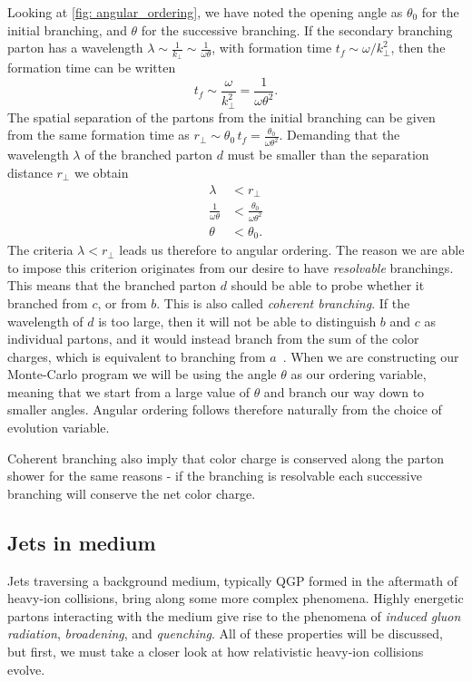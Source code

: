 \documentclass[main.tex]{subfiles}
\begin{document}
Looking at \autoref{fig: angular_ordering}, we have noted the opening angle as \(\theta_0\) for the initial branching, and \(\theta\) for the successive branching. If the secondary branching parton has a wavelength \(\lambda \sim \frac{1}{k_\perp} \sim \frac{1}{\omega \theta}\), with formation time \(t_f\sim \omega/k_\perp^2\), then the formation time can be written
\begin{equation}
    t_f \sim \frac{\omega}{k_\perp^2} = \frac{1}{\omega \theta^2}.
\end{equation}
The spatial separation of the partons from the initial branching can be given from the same formation time as \(r_\perp \sim \theta_0\, t_f = \frac{\theta_0}{\omega \theta^2}\). Demanding that the wavelength \(\lambda\) of the branched parton \(d\) must be smaller than the separation distance \(r_\perp\) we obtain
\begin{align}\label{eqn: angular_ordering}
    \lambda &< r_\perp \nonumber \\
    \frac{1}{\omega \theta} &< \frac{\theta_0}{\omega \theta^2} \nonumber \\
    \theta &< \theta_0.
\end{align}
The criteria \(\lambda < r_\perp\) leads us therefore to angular ordering. The reason we are able to impose this criterion originates from our desire to have \emph{resolvable} branchings. This means that the branched parton \(d\) should be able to probe whether it branched from \(c\), or from \(b\). This is also called \emph{coherent branching}. If the wavelength of \(d\) is too large, then it will not be able to distinguish \(b\) and \(c\) as individual partons, and it would instead branch from the sum of the color charges, which is equivalent to branching from \(a\)~\cite{Dokshitzer:1991wu}. When we are constructing our Monte-Carlo program we will be using the angle \(\theta\) as our ordering variable, meaning that we start from a large value of \(\theta\) and branch our way down to smaller angles. Angular ordering follows therefore naturally from the choice of evolution variable.

Coherent branching also imply that color charge is conserved along the parton shower for the same reasons - if the branching is resolvable each successive branching will conserve the net color charge. 

\subsection{Jets in medium}
Jets traversing a background medium, typically QGP formed in the aftermath of heavy-ion collisions, bring along some more complex phenomena. Highly energetic partons interacting with the medium give rise to the phenomena of \emph{induced gluon radiation}, \emph{broadening}, and \emph{quenching}. All of these properties will be discussed, but first, we must take a closer look at how relativistic heavy-ion collisions evolve.
\end{document}

